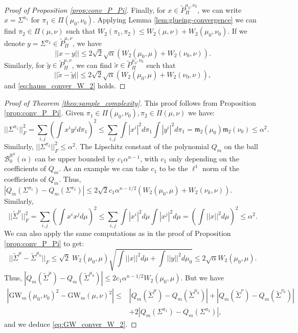 \documentclass{article}
\newcommand{\R}{\mathbb{R}}
\newcommand{\B}{\mathcal{B}}
\newcommand{\1}{\mathbf{1}}
\newcommand{\GW}{\mathrm{GW}}
\theoremstyle{definition}
\theoremstyle{remark}
\begin{document}
\begin{appendices}
\begin{proof}[Proof of Proposition \ref{prop:conv_P_Pi}]
    Finally, for $x\in \tilde{P}_\Pi^{\mu_0,\nu_0}$, we can write $x=\Sigma^{\pi_1}$ for $\pi_1\in \Pi(\mu_0,\nu_0)$. Applying  Lemma \ref{lem:glueing-convergence} we can find $\pi_2\in  \Pi(\mu,\nu)$ such that $W_2(\pi_1,\pi_2)\leq W_2(\mu,\nu)+W_2(\mu_0,\nu_0)$. If we denote $y=\Sigma^{\pi_2}\in \tilde{P}_\Pi^{\mu,\nu}$, we have 
    \[||x-y||\leq 2\sqrt{2} \sqrt{\alpha }(W_2 (\mu_{0},\mu)+W_2(\nu_{0},\nu) ).\]
    Similarly, for $\tilde y\in \tilde{P}_\Pi^{\mu,\nu}$, we can find $\tilde  x\in \tilde{P}_\Pi^{\mu_0,\nu_0}$ such that 
    \[||\tilde x-\tilde y||\leq 2\sqrt{2} \sqrt{\alpha }(W_2 (\mu_{0},\mu)+W_2(\nu_{0},\nu) ),\]
    and \eqref{eq:hauss_conver_W_2} holds.
\end{proof}

\begin{proof}[Proof of Theorem \ref{theo:sample_complexity}]
    This proof follows from Proposition \ref{prop:conv_P_Pi}. Given  $\pi_1\in \Pi(\mu_0,\nu_0),\pi_2\in  \Pi(\mu,\nu)$ we have: 
    \begin{equation*}
            ||\Sigma^{\pi_1}||^2_F =\sum_{i,j}\left(\int x^iy^jd\pi_1\right)^2  \leq\sum_{i,j}\int |x^i|^2d\pi_1\int |y^i|^2d\pi_1= \mathfrak{m}_2(\mu_0)\mathfrak{m}_2(\nu_0)\leq   \alpha^2.
    \end{equation*}
    Similarly, $||\Sigma^{\pi_2}||^2_F\leq   \alpha^2$. The Lipschitz constant of the polynomial $Q_m$ on the ball $\B_0^{\R^d}(\alpha)$ can be upper bounded by $c_1\alpha^{n-1}$, with $c_1$ only depending on the coefficients of $Q_m$. As an example we can take $c_1$ to be the $\ell^1$ norm of  the coefficients of $Q_m$. Thus,   $|Q_m(\Sigma^{\pi_1})-Q_m(\Sigma^{\pi_2})|\leq 2\sqrt{2}   c_1 \alpha^{n-1/2}(W_2 (\mu_0,\mu)+W_2(\nu_{k},\nu) ).$ 
    Similarly,
    \begin{equation*}
            ||\tilde{\Sigma}^{\mu}||^2_F =\sum_{i,j}\left(\int x^ix^jd\mu\right)^2  \leq\sum_{i,j}\int |x^i|^2d\mu\int |x^j|^2d\mu=\left(\int ||x||^2d\mu\right)^2\leq   \alpha^2.
    \end{equation*}
    We can also apply the same computations as in the proof of Proposition \ref{prop:conv_P_Pi} to get:
    \[||\tilde{\Sigma}^{\mu}-\tilde{\Sigma}^{\mu_0}||_F\leq \sqrt{2} \; W_2(\mu_0,\mu)\sqrt{\int ||x||^2d\mu+\int ||y||^2d\mu_0}\leq 2\sqrt{\alpha}  W_2(\mu_0,\mu).\]
    Thus, $|Q_m(\tilde{\Sigma}^{\mu})-Q_m(\tilde{\Sigma}^{\mu_0})|\leq 2   c_1 \alpha^{n-1/2}W_2 (\mu_{0},\mu).$ 
     But we have
     \begin{align*}
         |\GW_m(\mu_0,\nu_0)^2-\GW_m(\mu,\nu)^2|\leq& |Q_m(\tilde{\Sigma}^{\mu})-Q_m(\tilde{\Sigma}^{\mu_0})|+|Q_m(\tilde{\Sigma}^{\nu})-Q_m(\tilde{\Sigma}^{\nu_0})|\\ &+ 2|Q_m(\Sigma^{\pi_1})-Q_m(\Sigma^{\pi_2})|,
     \end{align*}
     and we deduce \eqref{eq:GW_conver_W_2}.
\end{proof}


\end{appendices}
\end{document}
